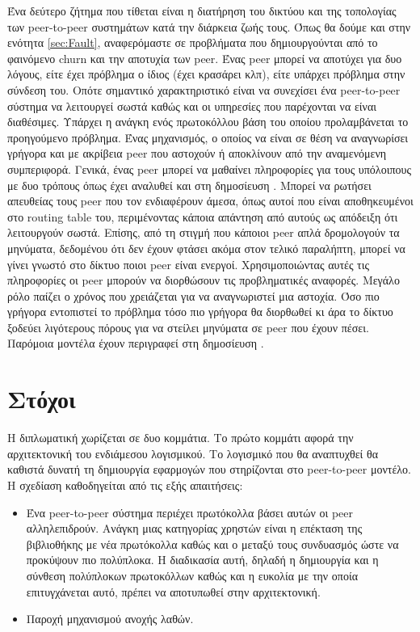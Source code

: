 Ένα δεύτερο ζήτημα που τίθεται είναι η διατήρηση του δικτύου και της 
τοπολογίας των peer-to-peer συστημάτων κατά την διάρκεια ζωής τους. Όπως 
θα δούμε και στην ενότητα \ref{sec:Fault}, αναφερόμαστε σε προβλήματα που 
δημιουργούνται από το φαινόμενο churn και την αποτυχία των peer. Ένας 
peer μπορεί να αποτύχει για δυο λόγους, είτε έχει πρόβλημα ο ίδιος (έχει 
κρασάρει κλπ), είτε υπάρχει πρόβλημα στην σύνδεση του. Οπότε σημαντικό 
χαρακτηριστικό είναι να συνεχίσει ένα peer-to-peer σύστημα να λειτουργεί 
σωστά καθώς και οι υπηρεσίες που παρέχονται να είναι διαθέσιμες. Υπάρχει 
η ανάγκη ενός πρωτοκόλλου βάση του οποίου προλαμβάνεται το προηγούμενο 
πρόβλημα. Ένας μηχανισμός, ο οποίος να είναι σε θέση να αναγνωρίσει 
γρήγορα και με ακρίβεια peer που αστοχούν ή αποκλίνουν από την 
αναμενόμενη συμπεριφορά. Γενικά, ένας peer μπορεί να μαθαίνει 
πληροφορίες για τους υπόλοιπους με δυο τρόπους όπως έχει αναλυθεί και 
στη δημοσίευση \citep{Stoica2005}. Μπορεί να ρωτήσει απευθείας τους peer 
που τον ενδιαφέρουν άμεσα, όπως αυτοί που είναι αποθηκευμένοι στο 
routing table του, περιμένοντας κάποια απάντηση από αυτούς ως απόδειξη 
ότι λειτουργούν σωστά. Επίσης, από τη στιγμή που κάποιοι peer απλά 
δρομολογούν τα μηνύματα, δεδομένου ότι δεν έχουν φτάσει ακόμα στον 
τελικό παραλήπτη, μπορεί να γίνει γνωστό στο δίκτυο ποιοι peer είναι 
ενεργοί. Χρησιμοποιώντας αυτές τις πληροφορίες οι peer μπορούν να 
διορθώσουν τις προβληματικές αναφορές. Μεγάλο ρόλο παίζει ο χρόνος που 
χρειάζεται για να αναγνωριστεί μια αστοχία. Όσο πιο γρήγορα εντοπιστεί 
το πρόβλημα τόσο πιο γρήγορα θα διορθωθεί κι άρα το δίκτυο ξοδεύει 
λιγότερους πόρους για να στείλει μηνύματα σε peer που έχουν πέσει. 
Παρόμοια μοντέλα έχουν περιγραφεί στη δημοσίευση \citep{Rodrigues2002}.

\section{Στόχοι}

Η διπλωματική χωρίζεται σε δυο κομμάτια. Το πρώτο κομμάτι αφορά την 
αρχιτεκτονική του ενδιάμεσου λογισμικού. Το λογισμικό που θα αναπτυχθεί 
θα καθιστά δυνατή τη δημιουργία εφαρμογών που στηρίζονται στο peer-to-peer 
μοντέλο. Η σχεδίαση καθοδηγείται από τις εξής απαιτήσεις:

\begin{itemize}
\item Ένα peer-to-peer σύστημα περιέχει πρωτόκολλα βάσει αυτών οι peer 
αλληλεπιδρούν. Ανάγκη μιας κατηγορίας χρηστών είναι η επέκταση της 
βιβλιοθήκης με νέα πρωτόκολλα καθώς και ο μεταξύ τους συνδυασμός ώστε να 
προκύψουν πιο πολύπλοκα. Η διαδικασία αυτή, δηλαδή η δημιουργία και η 
σύνθεση πολύπλοκων πρωτοκόλλων καθώς και η ευκολία με την οποία 
επιτυγχάνεται αυτό, πρέπει να αποτυπωθεί στην αρχιτεκτονική.
\item Παροχή μηχανισμού ανοχής λαθών.
\end{itemize}

